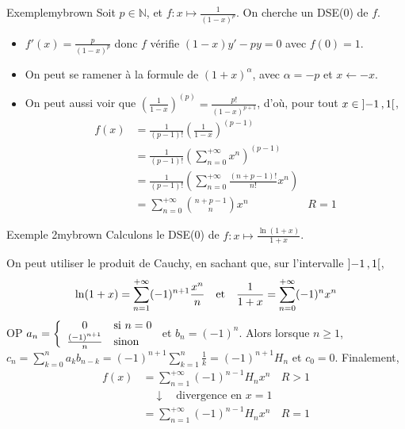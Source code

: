     \begin{omed}{Exemple}{mybrown}
        Soit $p \in \mathbb{N}$, et $f : x \mapsto \frac{1}{(1-x)^p}$. On cherche un DSE(0) de $f$.
        \begin{itemize}
            \item $f'(x) = \frac{p}{(1-x)^p}$ donc $f$ vérifie $(1-x)y' - py = 0$ avec $f(0) = 1$.
            \item On peut se ramener à la formule de $(1+x)^{\alpha}$, avec $\alpha = -p$ et $x \leftarrow -x$.
            \item On peut aussi voir que $\left(\frac{1}{1-x}\right)^{(p)} = \frac{p!}{(1-x)^{p+1}}$, d’où, pour tout $x \in \left] -1 \, , 1 \right[$, 
            \begin{align*}
                f(x) 
                &= \frac{1}{(p-1)!} \left(\frac{1}{1-x}\right)^{(p-1)} \\
                &= \frac{1}{(p-1)!} \left(\sum_{n=0}^{+\infty} x^n \right)^{(p-1)} \\
                &= \frac{1}{(p-1)!} \left(\sum_{n=0}^{+\infty} \frac{(n+p-1)!}{n!}  x^n\right) \\
                &= \sum_{n=0}^{+\infty} \binom{n+p-1}{n} x^n & R = 1
            \end{align*}
        \end{itemize}
    \end{omed}

    \begin{omed}{Exemple 2}{mybrown}
        Calculons le DSE(0) de $f : x \mapsto \frac{\ln(1+x)}{1+x}$. 
        
        On peut utiliser le produit de Cauchy, en sachant que, sur l’intervalle $\left] -1 \, , 1 \right[$,
            \[ \ln(1+x) = \sum_{n=1}^{+\infty} (-1)^{n+1} \frac{x^n}{n} \quad \text{et} \quad \frac{1}{1+x} = \sum_{n=0}^{+\infty} (-1)^n x^n \]
            OP $a_n = \sisinon{0}{n=0}{\frac{(-1)^{n+1}}{n}}$ et $b_n = (-1)^n$. Alors lorsque $n \geq 1$, $c_n = \sum_{k=0}^{n} a_k b_{n-k} = (-1)^{n+1} \sum_{k=1}^{n} \frac{1}{k} = (-1)^{n+1} H_n$ et $c_0 = 0$. Finalement, 
            \begin{align*}
                f(x) &= \sum_{n=1}^{+\infty} (-1)^{n-1} H_n x^n & R > 1  \\
                &\quad \downarrow \quad \text{divergence en } x = 1 \\
                &= \sum_{n=1}^{+\infty} (-1)^{n-1} H_n x^n & R = 1
            \end{align*}
    \end{omed}

